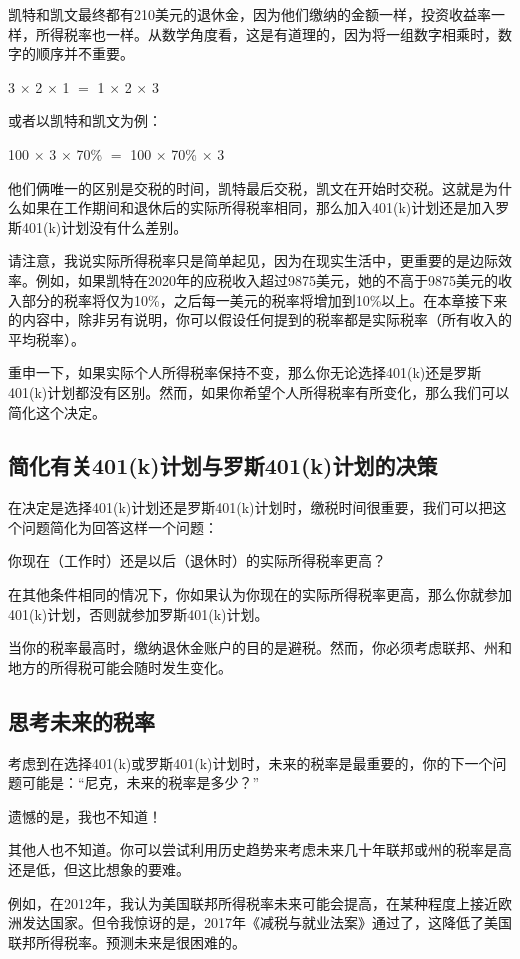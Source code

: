 凯特和凯文最终都有210美元的退休金，因为他们缴纳的金额一样，投资收益率一样，所得税率也一样。从数学角度看，这是有道理的，因为将一组数字相乘时，数字的顺序并不重要。

3 $\times$ 2 $\times$ 1 $=$ 1 $\times$ 2 $\times$ 3

或者以凯特和凯文为例：

100 $\times$ 3 $\times$ 70\% $=$ 100 $\times$ 70\% $\times$ 3

他们俩唯一的区别是交税的时间，凯特最后交税，凯文在开始时交税。这就是为什么如果在工作期间和退休后的实际所得税率相同，那么加入401(k)计划还是加入罗斯401(k)计划没有什么差别。

请注意，我说实际所得税率只是简单起见，因为在现实生活中，更重要的是边际效率。例如，如果凯特在2020年的应税收入超过9875美元，她的不高于9875美元的收入部分的税率将仅为10\%，之后每一美元的税率将增加到10\%以上。在本章接下来的内容中，除非另有说明，你可以假设任何提到的税率都是实际税率（所有收入的平均税率）。

重申一下，如果实际个人所得税率保持不变，那么你无论选择401(k)还是罗斯401(k)计划都没有区别。然而，如果你希望个人所得税率有所变化，那么我们可以简化这个决定。

\subsection{简化有关401(k)计划与罗斯401(k)计划的决策}

在决定是选择401(k)计划还是罗斯401(k)计划时，缴税时间很重要，我们可以把这个问题简化为回答这样一个问题：

你现在（工作时）还是以后（退休时）的实际所得税率更高？

在其他条件相同的情况下，你如果认为你现在的实际所得税率更高，那么你就参加401(k)计划，否则就参加罗斯401(k)计划。

当你的税率最高时，缴纳退休金账户的目的是避税。然而，你必须考虑联邦、州和地方的所得税可能会随时发生变化。

\subsection{思考未来的税率}

考虑到在选择401(k)或罗斯401(k)计划时，未来的税率是最重要的，你的下一个问题可能是：“尼克，未来的税率是多少？”

遗憾的是，我也不知道！

其他人也不知道。你可以尝试利用历史趋势来考虑未来几十年联邦或州的税率是高还是低，但这比想象的要难。

例如，在2012年，我认为美国联邦所得税率未来可能会提高，在某种程度上接近欧洲发达国家。但令我惊讶的是，2017年《减税与就业法案》通过了，这降低了美国联邦所得税率。预测未来是很困难的。

